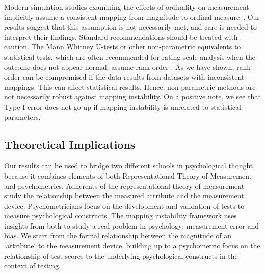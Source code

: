 \documentclass[titlepage, a4paper, 11pt]{article}
\begin{document}
Modern simulation studies examining the effects of ordinality on measurement implicitly assume a consistent mapping from magnitude to ordinal measure~\citep{kindermann_reliability_2023, wu_can_2017}. Our results suggest that this assumption is not necessarily met, and care is needed to interpret their findings. Standard recommendations should be treated with caution. The Mann Whitney U-tests or other non-parametric equivalents to statistical tests, which are often recommended for rating scale analysis when the outcome does not appear normal, assume rank order \citep{mann_test_1947}. As we have shown, rank order can be compromised if the data results from datasets with inconsistent mappings. This can affect statistical results. Hence, non-parametric methods are not necessarily robust against mapping instability. On a positive note, we see that Type-I error does not go up if mapping instability is unrelated to statistical parameters. 

\subsection{Theoretical Implications}
Our results can be used to bridge two different schools in psychological thought, because it combines elements of both Representational Theory of Measurement and psychometrics. Adherents of the representational theory of measurement study the relationship between the measured attribute and the measurement device. Psychometricians focus on the development and validation of tests to measure psychological constructs. The mapping instability framework uses insights from both to study a real problem in psychology: measurement error and bias. We start from the formal relationship between the magnitude of an `attribute` to the measurement device, building up to a psychometric focus on the relationship of test scores to the underlying psychological constructs in the context of testing. 
\end{document}
